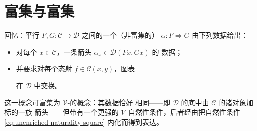 
\providecommand{\Cat}{\mathcal{C}at}
\providecommand{\sSet}{s\mathcal{S}et}

\section{富集\trNaturalTransformation{}与富集\trYonedaLemma}\label{sec:enriched-yoneda-lemma}

回忆：平行\trFunctor{} $F,G\colon\mathcal{C}\to\mathcal{D}$ 之间的一个（非富集的）%
\trNaturalTransformation{} $\alpha\colon F\Rightarrow G$ 由下列数据给出：
\begin{itemize}
\item 对每个 $x\in\mathcal{C}$，一条箭头 $\alpha_{x}\in\mathcal{D}(Fx,Gx)$ 的
  数据；
\item 并要求对每个态射 $f\in\mathcal{C}(x,y)$，图表
\begin{rveq}\label{eq:unenriched-naturality-square}
\end{rveq}
  在 $\mathcal{D}$ 中交换。
\end{itemize}

这一概念可富集为 $\mathcal{V}$-\trNaturalTransformation{}的概念：其数据恰好
相同——即 $\mathcal{D}$ 的底\trCategory{}中由 $\mathcal{C}$ 的诸对象加标的一族
箭头——但带有一个更强的 $\mathcal{V}$-自然性条件，后者经由把自然性条件
\eqref{eq:unenriched-naturality-square} 内化而得到表达。

